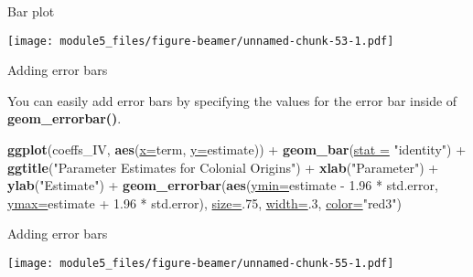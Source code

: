 \documentclass[ignorenonframetext,]{beamer}
\newenvironment{Shaded}{\begin{snugshade}}{\end{snugshade}}
\newcommand{\KeywordTok}[1]{\textcolor[rgb]{0.26,0.66,0.93}{\textbf{#1}}}
\newcommand{\DataTypeTok}[1]{\textcolor[rgb]{0.74,0.68,0.62}{\underline{#1}}}
\newcommand{\DecValTok}[1]{\textcolor[rgb]{0.27,0.67,0.26}{#1}}
\newcommand{\FloatTok}[1]{\textcolor[rgb]{0.27,0.67,0.26}{#1}}
\newcommand{\StringTok}[1]{\textcolor[rgb]{0.02,0.61,0.04}{#1}}
\newcommand{\OperatorTok}[1]{\textcolor[rgb]{0.74,0.68,0.62}{#1}}
\newcommand{\NormalTok}[1]{\textcolor[rgb]{0.74,0.68,0.62}{#1}}
\begin{document}
\begin{frame}{Bar plot}

\texttt{[image: module5\_files/figure-beamer/unnamed-chunk-53-1.pdf]}

\end{frame}

\begin{frame}[fragile]{Adding error bars}

You can easily add error bars by specifying the values for the error bar
inside of \textbf{geom\_errorbar()}.

\begin{Shaded}
\begin{Highlighting}[]
\KeywordTok{ggplot}\NormalTok{(coeffs_IV, }
  \KeywordTok{aes}\NormalTok{(}\DataTypeTok{x=}\NormalTok{term, }\DataTypeTok{y=}\NormalTok{estimate)) }\OperatorTok{+}\StringTok{ }
\StringTok{  }\KeywordTok{geom_bar}\NormalTok{(}\DataTypeTok{stat =} \StringTok{"identity"}\NormalTok{) }\OperatorTok{+}\StringTok{ }
\StringTok{  }\KeywordTok{ggtitle}\NormalTok{(}\StringTok{"Parameter Estimates for Colonial Origins"}\NormalTok{) }\OperatorTok{+}
\StringTok{  }\KeywordTok{xlab}\NormalTok{(}\StringTok{"Parameter"}\NormalTok{) }\OperatorTok{+}\StringTok{ }\KeywordTok{ylab}\NormalTok{(}\StringTok{"Estimate"}\NormalTok{) }\OperatorTok{+}
\StringTok{  }\KeywordTok{geom_errorbar}\NormalTok{(}\KeywordTok{aes}\NormalTok{(}\DataTypeTok{ymin=}\NormalTok{estimate }\OperatorTok{-}\StringTok{ }\FloatTok{1.96} \OperatorTok{*}\StringTok{ }\NormalTok{std.error, }
                    \DataTypeTok{ymax=}\NormalTok{estimate }\OperatorTok{+}\StringTok{ }\FloatTok{1.96} \OperatorTok{*}\StringTok{ }\NormalTok{std.error), }
                    \DataTypeTok{size=}\NormalTok{.}\DecValTok{75}\NormalTok{, }\DataTypeTok{width=}\NormalTok{.}\DecValTok{3}\NormalTok{, }\DataTypeTok{color=}\StringTok{"red3"}\NormalTok{)}
\end{Highlighting}
\end{Shaded}

\end{frame}

\begin{frame}{Adding error bars}

\texttt{[image: module5\_files/figure-beamer/unnamed-chunk-55-1.pdf]}

\end{frame}
\end{document}
